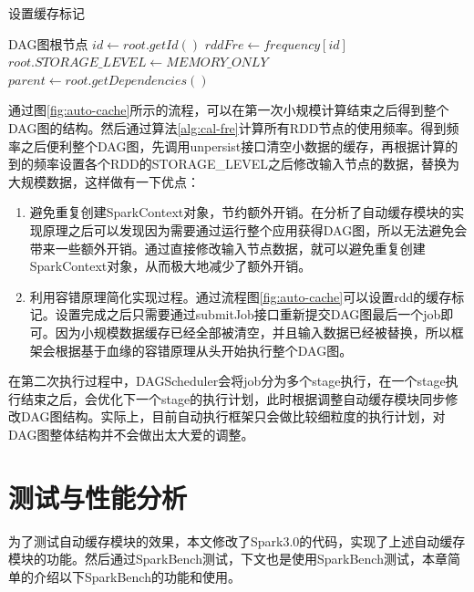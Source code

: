 \begin{algorithm}  
    \caption{设置缓存标记}  
    \begin{algorithmic}[1] %
        \Require DAG图根节点
            \State $id \gets root.getId()$
            \State $rddFre \gets frequency[id]$
                \State $root.STORAGE\_LEVEL \gets MEMORY\_ONLY$
            \EndIf
            \State $parent \gets root.getDependencies()$
                \State {}
            \EndFor
        \EndFunction
    \end{algorithmic}
    \label{alg:set-cache}
\end{algorithm}

通过图\ref{fig:auto-cache}所示的流程，可以在第一次小规模计算结束之后得到整个DAG图的结构。然后通过算法\ref{alg:cal-fre}计算所有RDD节点的使用频率。得到频率之后便利整个DAG图，先调用unpersist接口清空小数据的缓存，再根据计算的到的频率设置各个RDD的STORAGE\_LEVEL之后修改输入节点的数据，替换为大规模数据，这样做有一下优点：

\begin{enumerate}
    \item 避免重复创建SparkContext对象，节约额外开销。在分析了自动缓存模块的实现原理之后可以发现因为需要通过运行整个应用获得DAG图，所以无法避免会带来一些额外开销。通过直接修改输入节点数据，就可以避免重复创建SparkContext对象，从而极大地减少了额外开销。
    \item 利用容错原理简化实现过程。通过流程图\ref{fig:auto-cache}可以设置rdd的缓存标记。设置完成之后只需要通过submitJob接口重新提交DAG图最后一个job即可。因为小规模数据缓存已经全部被清空，并且输入数据已经被替换，所以框架会根据基于血缘的容错原理从头开始执行整个DAG图。
\end{enumerate}

在第二次执行过程中，DAGScheduler会将job分为多个stage执行，在一个stage执行结束之后，会优化下一个stage的执行计划，此时根据调整自动缓存模块同步修改DAG图结构。实际上，目前自动执行框架只会做比较细粒度的执行计划，对DAG图整体结构并不会做出太大爱的调整。

\section{测试与性能分析}

为了测试自动缓存模块的效果，本文修改了Spark3.0的代码，实现了上述自动缓存模块的功能。然后通过SparkBench测试，下文也是使用SparkBench测试，本章简单的介绍以下SparkBench的功能和使用。

